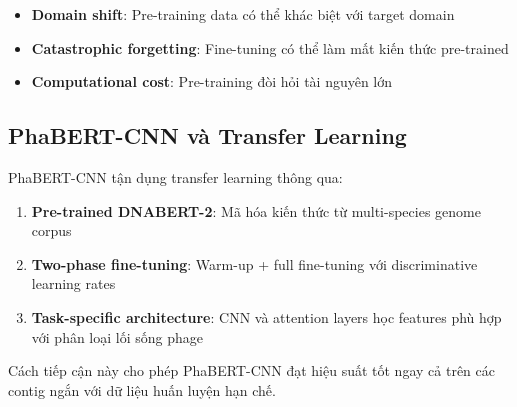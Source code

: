 \begin{itemize}
    \item \textbf{Domain shift}: Pre-training data có thể khác biệt với target domain
    \item \textbf{Catastrophic forgetting}: Fine-tuning có thể làm mất kiến thức pre-trained
    \item \textbf{Computational cost}: Pre-training đòi hỏi tài nguyên lớn
\end{itemize}

\subsection{PhaBERT-CNN và Transfer Learning}

PhaBERT-CNN tận dụng transfer learning thông qua:

\begin{enumerate}
    \item \textbf{Pre-trained DNABERT-2}: Mã hóa kiến thức từ multi-species genome corpus
    \item \textbf{Two-phase fine-tuning}: Warm-up + full fine-tuning với discriminative learning rates
    \item \textbf{Task-specific architecture}: CNN và attention layers học features phù hợp với phân loại lối sống phage
\end{enumerate}

Cách tiếp cận này cho phép PhaBERT-CNN đạt hiệu suất tốt ngay cả trên các contig ngắn với dữ liệu huấn luyện hạn chế.
